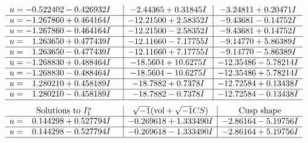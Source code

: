 \documentclass[1p]{elsarticle_modified}
\theoremstyle{definition}
\newcommand{\I}{\sqrt{-1}}
\begin{document}
$$\begin{array}{c|c|c}
\begin{aligned}
u &= -0.522402 - 0.426932 I\end{aligned}
 & -2.44365 + 0.31845 I & -3.24811 + 0.20471 I \\ \hline\begin{aligned}
u &= -1.267860 + 0.464164 I\end{aligned}
 & -12.21500 + 2.58352 I & -9.43681 - 0.14752 I \\ \hline\begin{aligned}
u &= -1.267860 - 0.464164 I\end{aligned}
 & -12.21500 - 2.58352 I & -9.43681 + 0.14752 I \\ \hline\begin{aligned}
u &= \phantom{-}1.263650 + 0.477439 I\end{aligned}
 & -12.11660 - 7.17755 I & -9.14770 + 5.86389 I \\ \hline\begin{aligned}
u &= \phantom{-}1.263650 - 0.477439 I\end{aligned}
 & -12.11660 + 7.17755 I & -9.14770 - 5.86389 I \\ \hline\begin{aligned}
u &= -1.268830 + 0.488464 I\end{aligned}
 & -18.5604 + 10.6275 I & -12.35486 - 5.78214 I \\ \hline\begin{aligned}
u &= -1.268830 - 0.488464 I\end{aligned}
 & -18.5604 - 10.6275 I & -12.35486 + 5.78214 I \\ \hline\begin{aligned}
u &= \phantom{-}1.280210 + 0.458189 I\end{aligned}
 & -18.7882 + 0.7378 I & -12.72584 + 0.13438 I \\ \hline\begin{aligned}
u &= \phantom{-}1.280210 - 0.458189 I\end{aligned}
 & -18.7882 - 0.7378 I & -12.72584 - 0.13438 I\\
 \hline 
 \end{array}$$\newpage$$\begin{array}{c|c|c}  
\text{Solutions to }I^u_{1}& \I (\text{vol} + \sqrt{-1}CS) & \text{Cusp shape}\\
 \hline 
\begin{aligned}
u &= \phantom{-}0.144298 + 0.527794 I\end{aligned}
 & -0.269618 + 1.333490 I & -2.86164 - 5.19756 I \\ \hline\begin{aligned}
u &= \phantom{-}0.144298 - 0.527794 I\end{aligned}
 & -0.269618 - 1.333490 I & -2.86164 + 5.19756 I\\
 \hline 
 \end{array}$$\newpage
\end{document}
